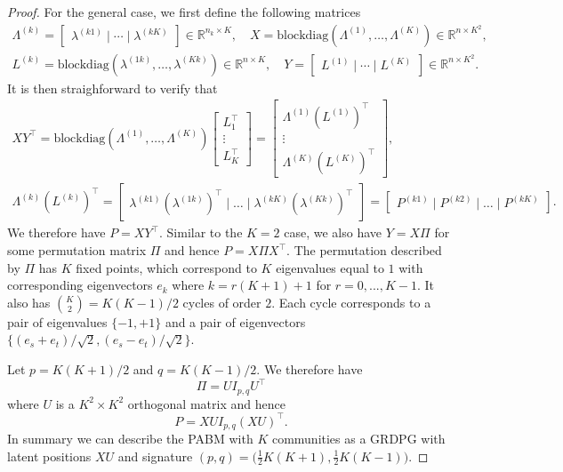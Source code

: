 \documentclass[12pt]{article}
\begin{document}
\begin{proof}
For the general case, we first define the following matrices
\begin{gather}
\label{eq:xy}
\Lambda^{(k)} = \begin{bmatrix} \lambda^{(k1)} \mid \cdots \mid \lambda^{(kK)} \end{bmatrix}
\in \mathbb{R}^{n_k \times K}, \quad
X = \text{blockdiag}(\Lambda^{(1)}, \dots, \Lambda^{(K)}) \in
\mathbb{R}^{n \times K^2}, \\
L^{(k)} = \text{blockdiag}(\lambda^{(1k)}, \dots, \lambda^{(Kk)}) \in
\mathbb{R}^{n \times K}, \quad
Y = \begin{bmatrix} L^{(1)} \mid \cdots \mid L^{(K)} \end{bmatrix} \in
\mathbb{R}^{n \times K^2}.
\end{gather}
It is then straighforward to verify that
\begin{gather*}
  XY^{\top} = \text{blockdiag}(\Lambda^{(1)}, \dots,
\Lambda^{(K)}) \begin{bmatrix} L_1^{\top} \\ \vdots \\
  L_{K}^{\top} \end{bmatrix} = \begin{bmatrix} \Lambda^{(1)}
  (L^{(1)})^{\top} \\ \vdots \\
  \Lambda^{(K)} (L^{(K)})^{\top} \end{bmatrix}, \\
\Lambda^{(k)} (L^{(k)})^{\top} = \begin{bmatrix} \lambda^{(k1)}
  (\lambda^{(1k)})^{\top} \mid \dots \mid \lambda^{(kK)}
  (\lambda^{(Kk)})^{\top} \end{bmatrix} = \begin{bmatrix} P^{(k1)}
  \mid P^{(k2)} \mid \dots \mid P^{(kK)} \end{bmatrix}.
\end{gather*}
We therefore have $P = X Y^\top$. 
Similar to the $K = 2$ case, we also have $Y = X \Pi$ for some permutation matrix
$\Pi$ and hence $P = X \Pi X^\top$.
The permutation described by $\Pi$ has $K$ fixed points, which correspond to
$K$ eigenvalues equal to $1$ with corresponding eigenvectors $e_k$ where
$k = r (K + 1) + 1$ for $r = 0, ..., K - 1$. It also has
$\binom{K}{2} = K (K - 1) / 2$ cycles of order $2$. Each cycle corresponds to
a pair of eigenvalues $\{-1,+1\}$ and a pair of eigenvectors
$\{(e_s + e_t)/\sqrt{2},(e_s - e_t)/ \sqrt{2}\}$.

Let $p = K (K + 1) / 2$ and $q = K (K - 1) / 2$. 
We therefore have
\begin{equation} \label{eq:permutation}
\Pi = U I_{p,q} U^\top
\end{equation}
where $U$ is a $K^2 \times K^2$ orthogonal matrix and hence
\begin{equation} \label{eq:pabm-grdpg}
P = X U I_{p, q} (X U)^\top.
\end{equation}
In summary we can describe the PABM with $K$ communities as a GRDPG with latent
positions $X U$ and signature $(p,q) = \bigl( \tfrac{1}{2} K (K + 1) ,
\tfrac{1}{2} K (K - 1)\bigr)$.
\end{proof}
\end{document}
